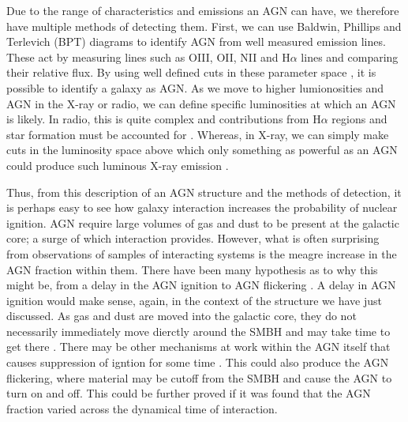 
Due to the range of characteristics and emissions an AGN can have, we therefore have multiple methods of detecting them. First, we can use Baldwin, Phillips and Terlevich (BPT) diagrams to identify AGN from well measured emission lines. These act by measuring lines such as OIII, OII, NII and H$\alpha$ lines and comparing their relative flux. By using well defined cuts in these parameter space \citep{Paper that gives those cuts. It's Kennedy and Ho or something like this}, it is possible to identify a galaxy as AGN. As we move to higher lumionosities and AGN in the X-ray or radio, we can define specific luminosities at which an AGN is likely. In radio, this is quite complex and contributions from H$\alpha$ regions and star formation must be accounted for \citep{Paper on radio AGN identification}. Whereas, in X-ray, we can simply make cuts in the luminosity space above which only something as powerful as an AGN could produce such luminous X-ray emission \citep{Paper on X-ray emission}.

Thus, from this description of an AGN structure and the methods of detection, it is perhaps easy to see how galaxy interaction increases the probability of nuclear ignition. AGN require large volumes of gas and dust to be present at the galactic core; a surge of which interaction provides. However, what is often surprising from observations of samples of interacting systems is the meagre increase in the AGN fraction within them. There have been many hypothesis as to why this might be, from a delay in the AGN ignition \citep{Paper on delay in AGN ignition, probably Ellison 2011} to AGN flickering \citep{Paper on AGN flickering}. A delay in AGN ignition would make sense, again, in the context of the structure we have just discussed. As gas and dust are moved into the galactic core, they do not necessarily immediately move dierctly around the SMBH and may take time to get there \citep{Paper on why delay might happen}. There may be other mechanisms at work within the AGN itself that causes suppression of igntion for some time \citep{Paper on AGN mechansim being why delay could happen}. This could also produce the AGN flickering, where material may be cutoff from the SMBH and cause the AGN to turn on and off. This could be further proved if it was found that the AGN fraction varied across the dynamical time of interaction.

